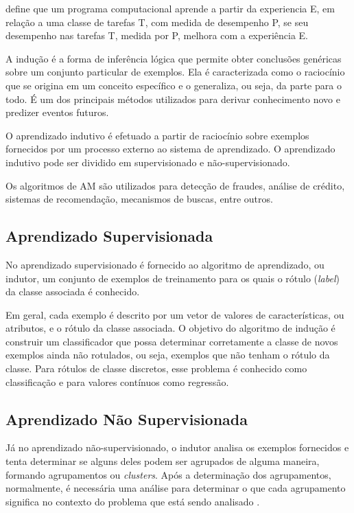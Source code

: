 \cite{mitchell1997} define que um programa computacional aprende a partir da experiencia E, em relação a uma classe de tarefas T, com medida de desempenho P, se seu desempenho nas tarefas T, medida por P, melhora com a experiência E.


A indução é a forma de inferência lógica que permite obter conclusões genéricas sobre um
conjunto particular de exemplos. Ela é caracterizada como o raciocínio que se origina em um conceito específico e o generaliza, ou seja, da parte para o todo. É um dos principais métodos utilizados para derivar conhecimento novo e predizer eventos futuros. 


O aprendizado indutivo é efetuado a partir de raciocínio sobre exemplos fornecidos por um processo externo ao sistema de aprendizado. O aprendizado indutivo pode ser dividido em supervisionado e não-supervisionado. 

Os algoritmos de AM são utilizados para detecção de fraudes, análise de crédito, sistemas de recomendação, mecanismos de buscas, entre outros.



\subsection{Aprendizado Supervisionada}


No aprendizado supervisionado é fornecido ao algoritmo de aprendizado, ou indutor, um conjunto de exemplos de treinamento para os quais o rótulo (\textit{label}) da classe associada é conhecido.

Em geral, cada exemplo é descrito por um vetor de valores de características, ou atributos, e o rótulo da classe associada. O objetivo do algoritmo de indução é construir um classificador que possa determinar corretamente a classe de novos exemplos ainda não rotulados, ou seja, exemplos que não tenham o rótulo da classe. Para rótulos de classe discretos, esse problema é conhecido como classificação e para valores contínuos como regressão. \cite{monard2003}



\subsection{Aprendizado Não Supervisionada}

Já no aprendizado não-supervisionado, o indutor analisa os exemplos fornecidos e tenta determinar se alguns deles podem ser agrupados de alguma maneira, formando agrupamentos ou \textit{clusters}. Após a determinação dos agrupamentos, normalmente, é necessária uma análise para determinar o que cada agrupamento significa no contexto do problema que está sendo analisado \cite{monard2003}.



